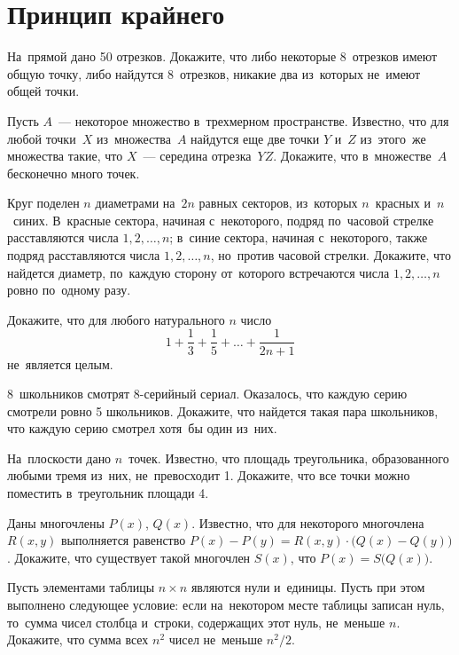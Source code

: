 
\section*{Принцип крайнего}


\begin{problems}

\item
На~прямой дано 50 отрезков.
Докажите, что либо некоторые 8~отрезков имеют общую точку, либо найдутся
8~отрезков, никакие два из~которых не~имеют общей точки.

\item
Пусть $A$~--- некоторое множество в~трехмерном пространстве.
Известно, что для любой точки~$X$ из~множества~$A$ найдутся еще две точки
$Y$ и~$Z$ из~этого~же множества такие, что $X$~--- середина отрезка~$YZ$.
Докажите, что в~множестве~$A$ бесконечно много точек.

\item
Круг поделен $n$ диаметрами на~$2 n$ равных секторов, из~которых $n$~красных
и~$n$~синих.
В~красные сектора, начиная с~некоторого, подряд по~часовой стрелке
расставляются числа $1, 2, \ldots, n$;
в~синие сектора, начиная с~некоторого, также подряд расставляются числа
$1, 2, \ldots, n$, но~против часовой стрелки.
Докажите, что найдется диаметр, по~каждую сторону от~которого встречаются числа
$1, 2, \ldots, n$ ровно по~одному разу.

\item
Докажите, что для любого натурального $n$ число
\[
    1 + \frac{1}{3} + \frac{1}{5} + \ldots + \frac{1}{2 n + 1}
\]
не~является целым.

\item
8~школьников смотрят 8-серийный сериал.
Оказалось, что каждую серию смотрели ровно 5 школьников.
Докажите, что найдется такая пара школьников, что каждую серию смотрел хотя~бы
один из~них.

\item
На~плоскости дано $n$~точек.
Известно, что площадь треугольника, образованного любыми тремя из~них,
не~превосходит 1.
Докажите, что все точки можно поместить в~треугольник площади 4.

\item
Даны многочлены $P(x)$, $Q(x)$.
Известно, что для некоторого многочлена $R(x, y)$ выполняется равенство
\(
    P(x) - P(y)
=
    R(x, y) \cdot \bigl( Q(x) - Q(y) \bigr)
\).
Докажите, что существует такой многочлен $S(x)$, что
$P(x) = S\bigl( Q(x) \bigr)$.

\item
Пусть элементами таблицы $n \times n$ являются нули и~единицы.
Пусть при этом выполнено следующее условие: если на~некотором месте таблицы
записан нуль, то~сумма чисел столбца и~строки, содержащих этот нуль,
не~меньше $n$.
Докажите, что сумма всех $n^2$ чисел не~меньше $n^2 / 2$.

\end{problems}


